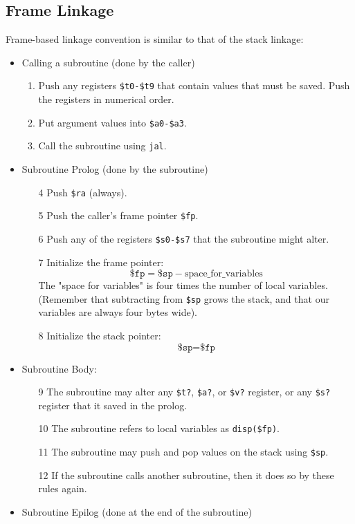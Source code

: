 \documentclass[12pt]{article}
\theoremstyle{definition}
\begin{document}
\subsection{Frame Linkage}
Frame-based linkage convention is similar to that of the stack linkage:
\begin{itemize}
\item Calling a subroutine (done by the caller)
\begin{enumerate}
\item Push any registers \texttt{\$t0-\$t9} that contain values that must be saved. Push the registers in numerical order.
\item Put argument values into \texttt{\$a0-\$a3}.
\item Call the subroutine using \texttt{jal}.
\end{enumerate}
\item Subroutine Prolog (done by the subroutine)
\begin{enumerate}
\item[4] Push \texttt{\$ra} (always).
\item[5] Push the caller's frame pointer \texttt{\$fp}.
\item[6] Push any of the registers \texttt{\$s0-\$s7} that the subroutine might alter.
\item[7] Initialize the frame pointer: 
\[
\texttt{\$fp} = \texttt{\$sp} - \text{space\_for\_variables}
\]
The "space for variables" is four times the number of local variables. (Remember that subtracting from \texttt{\$sp} grows the stack, and that our variables are always four bytes wide).
\item[8] Initialize the stack pointer: 
\[
\texttt{\$sp} = \texttt{\$fp}
\]
\end{enumerate}
\item Subroutine Body:
\begin{enumerate}
\item[9] The subroutine may alter any \texttt{\$t?}, \texttt{\$a?}, or \texttt{\$v?} register, or any \texttt{\$s?} register that it saved in the prolog.
\item[10] The subroutine refers to local variables as \texttt{disp(\$fp)}.
\item[11] The subroutine may push and pop values on the stack using \texttt{\$sp}.
\item[12] If the subroutine calls another subroutine, then it does so by these rules again.
\end{enumerate}
\item Subroutine Epilog (done at the end of the subroutine)

\end{itemize}
\end{document}
